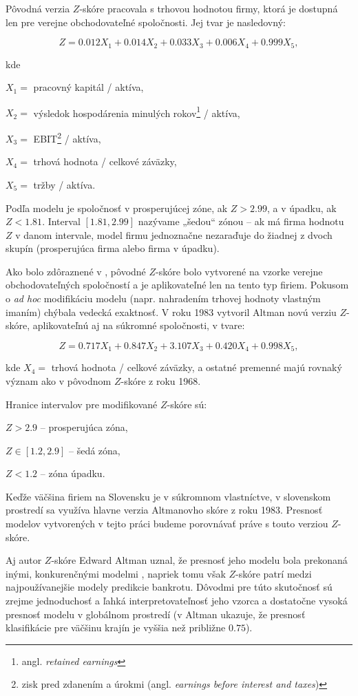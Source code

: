 Pôvodná verzia \(Z\)-skóre pracovala s trhovou hodnotou firmy, ktorá je dostupná len pre verejne obchodovateľné spoločnosti. Jej tvar je nasledovný:

\[
    Z = 0.012X_1 + 0.014X_2 + 0.033X_3 + 0.006X_4 + 0.999X_5,
\]

kde

\(X_1 = \) pracovný kapitál / aktíva,

\(X_2 = \) výsledok hospodárenia minulých rokov\footnote{angl. \emph{retained earnings}} / aktíva,

\(X_3 = \) EBIT\footnote{zisk pred zdanením a úrokmi (angl. \emph{earnings before interest and taxes})} / aktíva,

\(X_4 = \) trhová hodnota / celkové záväzky,

\(X_5 = \) tržby / aktíva.
\bigskip

Podľa modelu je spoločnosť v prosperujúcej zóne, ak \(Z > 2.99\), a v úpadku, ak \(Z < 1.81\).
Interval \([1.81, 2.99]\) nazývame „šedou“ zónou – ak má firma hodnotu \(Z\) v danom intervale, model firmu jednoznačne nezaraďuje do žiadnej z dvoch skupín
(prosperujúca firma alebo firma v úpadku).

Ako bolo zdôraznené v \cite{altman1983}, pôvodné \(Z\)-skóre bolo vytvorené na vzorke verejne obchodovateľných spoločností a je aplikovateľné len na tento typ firiem.
Pokusom o \emph{ad hoc} modifikáciu modelu (napr. nahradením trhovej hodnoty vlastným imaním) chýbala vedecká exaktnosť.
V roku 1983 vytvoril Altman novú verziu \(Z\)-skóre, aplikovateľnú aj na súkromné spoločnosti, v tvare:

\[
    Z = 0.717X_1 + 0.847X_2 + 3.107X_3 + 0.420X_4 + 0.998X_5,
\]

kde \(X_4 = \) trhová hodnota / celkové záväzky, a ostatné premenné majú rovnaký význam ako v pôvodnom \(Z\)-skóre z roku 1968.

Hranice intervalov pre modifikované \(Z\)-skóre sú:

\( Z > 2.9\) – prosperujúca zóna,

\( Z \in [1.2, 2.9]\) – šedá zóna,

\( Z < 1.2 \) – zóna úpadku.
\bigskip

Keďže väčšina firiem na Slovensku je v súkromnom vlastníctve, v slovenskom prostredí sa využíva hlavne verzia Altmanovho skóre z roku 1983.
Presnosť modelov vytvorených v tejto práci budeme porovnávať práve s touto verziou \(Z\)-skóre.

Aj autor \(Z\)-skóre Edward Altman uznal, že presnosť jeho modelu bola prekonaná inými, konkurenčnými modelmi \cite{altman2017}, napriek tomu však \(Z\)-skóre patrí medzi najpoužívanejšie modely predikcie bankrotu.
Dôvodmi pre túto skutočnosť sú zrejme jednoduchosť a ľahká interpretovateľnosť jeho vzorca a dostatočne vysoká presnosť modelu v globálnom prostredí
(v \cite{altman2017} Altman ukazuje, že presnosť klasifikácie pre väčšinu krajín je vyššia než približne \(0.75\)).


